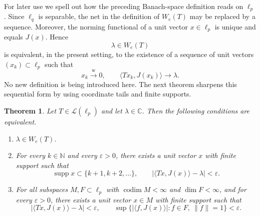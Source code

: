 \documentclass[11pt]{amsart}
\numberwithin{equation}{section}
\newtheorem{theorem}{Theorem}[section]
\theoremstyle{definition}
\theoremstyle{remark}
\DeclareMathOperator{\codim}{codim}
\DeclareMathOperator{\supp}{supp}
\newcommand{\C}{\mathbb{C}}
\newcommand{\N}{\mathbb{N}}
\newcommand{\ip}[2]{\langle #1,#2\rangle}
\newcommand{\We}{W_e}
\newcommand{\wto}{\xrightarrow{\mathrm w}}
\begin{document}
For later use we spell out how the preceding Banach-space definition reads on $\ell_p$. Since $\ell_q$ is separable, the net in the definition of $\We(T)$ may be replaced by a sequence. Moreover, the norming functional of a unit vector $x\in\ell_p$ is unique and equals $J(x)$. Hence
\[
\lambda\in\We(T)
\]
is equivalent, in the present setting, to the existence of a sequence of unit vectors $(x_k)\subset\ell_p$ such that
\[
        x_k\wto0,
        \qquad
        \ip{Tx_k}{J(x_k)}\to\lambda .
\]
No new definition is being introduced here.  The next theorem sharpens this sequential form by using coordinate tails and finite supports.
\begin{theorem}\label{thm:We-ellp-tail-char}
Let $T\in \mathcal L(\ell_p)$ and let $\lambda\in\C$. Then the following conditions are equivalent.
\begin{enumerate}[label=\textup{(\roman*)}]
\item $\lambda\in \We(T)$.
\item For every $k\in\N$ and every $\varepsilon>0$, there exists a unit vector $x$ with finite support such that
\[
\supp x\subset\{k+1,k+2,\dots\},
\qquad
|\ip{Tx}{J(x)}-\lambda|<\varepsilon.
\]
\item For all subspaces $M,F\subset \ell_p$ with $\codim M<\infty$ and $\dim F<\infty$, and for every $\varepsilon>0$, there exists a unit vector $x\in M$ with finite support such that
\[
|\ip{Tx}{J(x)}-\lambda|<\varepsilon,
\qquad
\sup\{|\ip{f}{J(x)}|: f\in F,\ \|f\|=1\}<\varepsilon.
\]
\end{enumerate}
\end{theorem}
\end{document}
